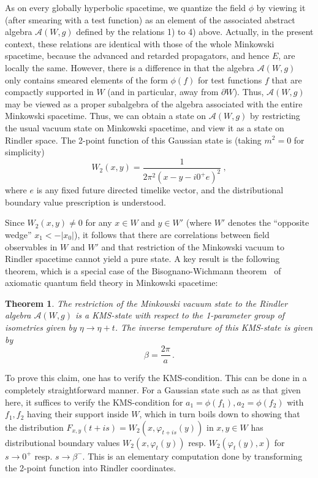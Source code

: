 \documentclass[12pt]{article}
\newcommand{\eA}{\mathscr{A}}
\theoremstyle{plain}
\newtheorem{theorem}[lemma]{Theorem}
\theoremstyle{definition}
\def\ben{\begin{equation}}
\def\een{\end{equation}}
\begin{document}
As on every globally hyperbolic spacetime, we quantize the field
$\phi$ by viewing it (after smearing with a test function) as an
element of the associated abstract algebra $\eA(W,g)$ defined by the
relations 1) to 4) above. Actually, in the present context, these
relations are identical with those of the whole Minkowski spacetime,
because the advanced and retarded propagators, and hence $E$, are
locally the same. However, there is a difference in that the algebra
$\eA(W, g)$ only contains smeared elements of the form $\phi(f)$ for
test functions $f$ that are compactly supported in $W$ (and in particular, away from $\partial W$). Thus,
$\eA(W,g)$ may be viewed as a proper subalgebra of the algebra
associated with the entire Minkowski spacetime. Thus, we can obtain
a state on $\eA(W,g)$ by restricting the usual vacuum state on Minkowski spacetime, and view it as a state on
Rindler space. The 2-point function of this Gaussian state is (taking $m^2=0$ for simplicity)
\ben
W_2(x,y) = \frac{1}{2\pi^2 (x-y-i0^+ e)^2} \ ,
\label{2ptfun}
\een
where $e$ is any fixed future directed timelike vector, and the distributional boundary
value prescription is understood.

Since $W_2(x,y) \neq 0$ for any
$x \in W$ and $y \in W'$ (where $W'$ denotes the ``opposite wedge'' $x_1 < - |x_0|$),
it follows that there are correlations between field observables in $W$ and $W'$ and
that restriction of the
Minkowski vacuum to Rindler spacetime cannot yield a pure state. A key result is the following theorem,
which is a special case of the Bisognano-Wichmann theorem~\cite{haag} of axiomatic quantum field theory in Minkowski
spacetime:

\medskip

\begin{theorem}
The restriction of the Minkowski vacuum state to the Rindler algebra $\eA(W, g)$ is
a KMS-state with respect to the 1-parameter group of isometries given
by $\eta \to \eta + t$. The inverse temperature of this KMS-state is given
by
\ben
\beta = \frac{2\pi}{a} \, .
\label{beta}
\een
\end{theorem}
 To prove this claim, one has to verify the KMS-condition. This can be done in
a completely straightforward manner. For a Gaussian state such as
as that given here, it suffices to verify the KMS-condition for $a_1=\phi(f_1), a_2=\phi(f_2)$
with $f_1,f_2$ having their support inside $W$,
which in turn boils down to showing that the distribution
$F_{x,y}(t+is) = W_2(x, \varphi_{t+is}(y))$ in $x,y \in W$ has distributional boundary
values $W_2(x,\varphi_t(y))$ resp. $W_2(\varphi_t(y), x)$ for $s \to 0^+$ resp. $s \to \beta^-$.
This is an elementary computation done by transforming the 2-point function
into Rindler coordinates.
\end{document}
